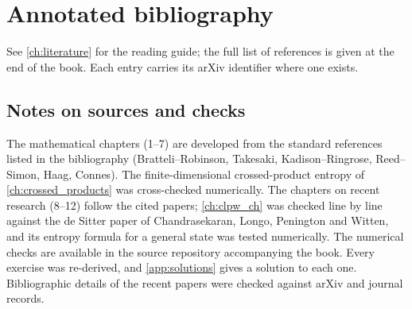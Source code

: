 \chapter{Annotated bibliography}\label{app:biblio}
See \cref{ch:literature} for the reading guide; the full list of references is given at the end of the book. Each entry carries its arXiv identifier where one exists.

\section*{Notes on sources and checks}
The mathematical chapters (1--7) are developed from the standard references listed in the bibliography (Bratteli--Robinson, Takesaki, Kadison--Ringrose, Reed--Simon, Haag, Connes). The finite-dimensional crossed-product entropy of \cref{ch:crossed_products} was cross-checked numerically. The chapters on recent research (8--12) follow the cited papers; \cref{ch:clpw_ch} was checked line by line against the de Sitter paper of Chandrasekaran, Longo, Penington and Witten, and its entropy formula for a general state was tested numerically. The numerical checks are available in the source repository accompanying the book. Every exercise was re-derived, and \cref{app:solutions} gives a solution to each one. Bibliographic details of the recent papers were checked against arXiv and journal records.
